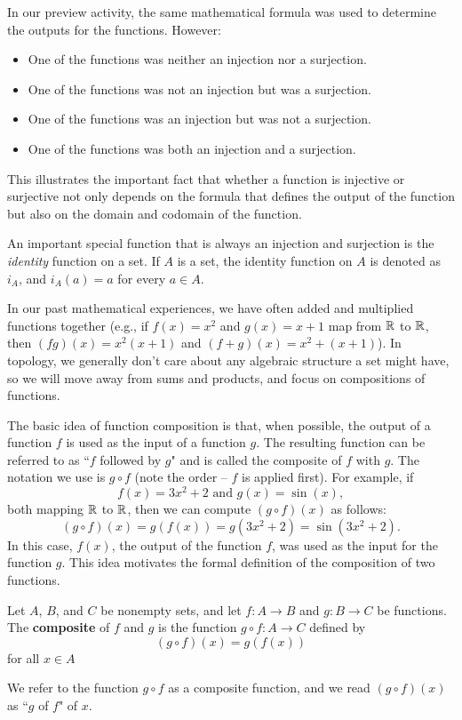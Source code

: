 In our preview activity, the same mathematical formula was used to determine the outputs for the functions. However:
\begin{itemize}
\item One of the functions was neither an injection nor a surjection. 
\item One of the functions was not an injection but was a surjection.
\item One of the functions was an injection but was not a surjection.
\item One of the functions was both an injection and a surjection.
\end{itemize}
This illustrates the important fact that whether a function is injective or surjective not only depends on the formula that defines the output of the function but also on the domain and codomain of the function.

An important special function that is always an injection and surjection is the \emph{identity} function on a set. If $A$ is a set, the identity function on $A$ is denoted as $i_A$, and $i_A(a) = a$ for every $a \in A$. 


In our past mathematical experiences, we have often added and multiplied functions together (e.g., if $f(x) = x^2$ and $g(x) = x+1$ map from $\mathbb{R}$ to $\mathbb{R}$, then $(fg)(x) = x^2(x+1)$ and $(f+g)(x) = x^2+(x+1)$).  In topology, we generally don't care about any algebraic structure a set might have, so we will move away from sums and products, and focus on compositions of functions.  

The basic idea of function composition is that, when possible, the output of a function $f$ is used as the input of a function $g$. The resulting function can be referred to as ``$f$ followed by $g$" and is called the composite of $f$ with $g$. The notation we use is $g \circ f$ (note the order -- $f$ is applied first). For example, if
\[f(x) = 3x^2 + 2 \text{ and } g(x) = \sin(x),\]
both mapping $\mathbb{R}$ to $\mathbb{R}$, then we can compute $(g \circ f)(x)$ as follows:
\[(g \circ f)(x) = g(f(x)) = g(3x^2 + 2) = \sin\left(3x^2 + 2\right).\]
In this case, $f(x)$, the output of the function $f$, was used as the input for the function $g$. This idea motivates the formal definition of the composition of two functions.

\begin{definition} Let $A$, $B$, and $C$ be nonempty sets, and let $f : A \to B$ and $g : B \to C$ be functions. The \textbf{composite} of $f$ and $g$ is the function $g \circ f : A \to C$ defined by
\[(g \circ f)(x) = g(f(x))\]
for all $x \in A$
\end{definition}
We refer to the function $g \circ f$ as a composite function, and we read $(g \circ f)(x)$ as ``$g$ of $f$" of $x$.

